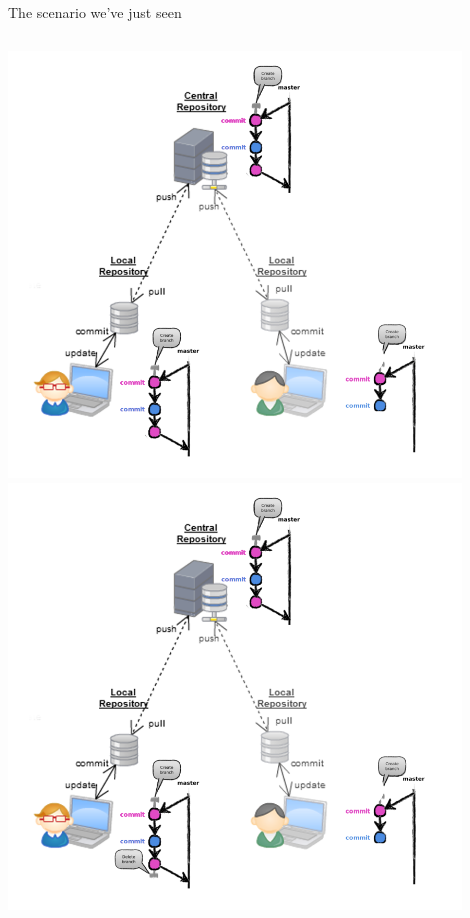 \begin{frame}[fragile]{The scenario we've just seen}
\begin{columns}
\begin{column}{0.4\textwidth}
\begin{center}
{				\includegraphics[width=0.9\textwidth]{multiuser_remote_merge.png}
			}\only<7> {
				\includegraphics[width=0.9\textwidth]{multiuser_my_delete.png}
			}\only<8> {
}
\end{center}
\end{column}
\end{columns}
\end{frame}
